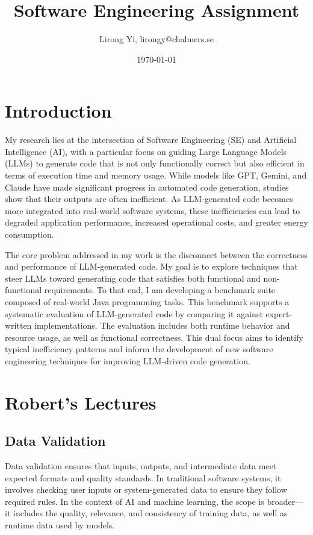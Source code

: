 \documentclass[11pt]{article}
\begin{document}
\title{Software Engineering Assignment}
\author{Lirong Yi, lirongy@chalmers.se}


\date{\today}

\maketitle

\section{Introduction}

My research lies at the intersection of Software Engineering (SE) and Artificial Intelligence (AI), with a particular focus on guiding Large Language Models (LLMs) to generate code that is not only functionally correct but also efficient in terms of execution time and memory usage. While models like GPT, Gemini, and Claude have made significant progress in automated code generation, studies show that their outputs are often inefficient. As LLM-generated code becomes more integrated into real-world software systems, these inefficiencies can lead to degraded application performance, increased operational costs, and greater energy consumption.

The core problem addressed in my work is the disconnect between the correctness and performance of LLM-generated code. My goal is to explore techniques that steer LLMs toward generating code that satisfies both functional and non-functional requirements. To that end, I am developing a benchmark suite composed of real-world Java programming tasks. This benchmark supports a systematic evaluation of LLM-generated code by comparing it against expert-written implementations. The evaluation includes both runtime behavior and resource usage, as well as functional correctness. This dual focus aims to identify typical inefficiency patterns and inform the development of new software engineering techniques for improving LLM-driven code generation.

\section{Robert’s Lectures}

\subsection{Data Validation}

Data validation ensures that inputs, outputs, and intermediate data meet expected formats and quality standards. In traditional software systems, it involves checking user inputs or system-generated data to ensure they follow required rules. In the context of AI and machine learning, the scope is broader—it includes the quality, relevance, and consistency of training data, as well as runtime data used by models.
\end{document}
